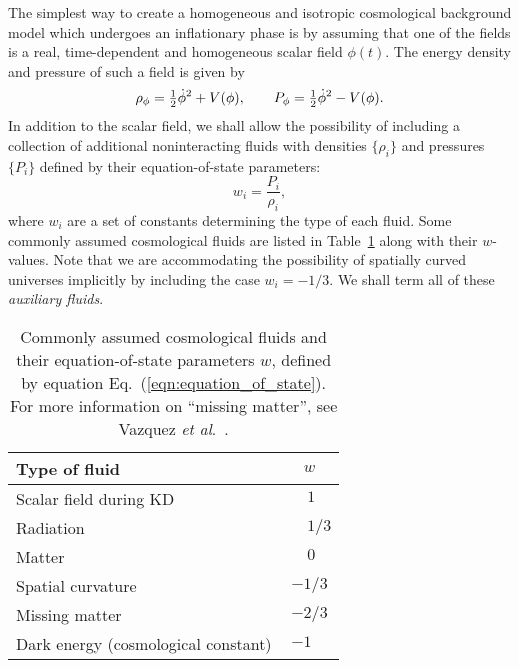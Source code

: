 The simplest way to create a homogeneous and isotropic cosmological
background model which undergoes an inflationary phase is by assuming
that one of the fields is a real, time-dependent and homogeneous
scalar field $\phi(t)$. The energy density and pressure of such a
field is given by 
%
\begin{equation}
  \rho_\phi = {\textstyle\frac{1}{2}}\dot{\phi}^2+V(\phi),
  \qquad
  P_\phi = {\textstyle\frac{1}{2}}\dot{\phi}^2-V(\phi).
  \label{eqn:rhopdef}
\end{equation}
%
In addition to the scalar field, we shall allow the possibility of
including a collection of additional noninteracting fluids with
densities $\{\rho_i\}$ and pressures $\{P_i\}$ defined by their
equation-of-state parameters:
%
\begin{equation}
  w_i =\frac{P_i}{\rho_i},
  \label{eqn:equation_of_state}
\end{equation}
%
where ${w_i}$ are a set of constants determining the type of each
fluid. Some commonly assumed cosmological fluids are listed in
Table~\ref{tab:type_of_fluid} along with their $w$-values. Note that
we are accommodating the possibility of spatially curved universes
implicitly by including the case $w_i=-1/3$. We shall term all of
these {\em auxiliary fluids}.
%
\begin{table}
  \caption{Commonly assumed cosmological fluids and their
    equation-of-state parameters $w$, defined by equation
    Eq.\ (\protect\ref{eqn:equation_of_state}).  For more information on
    ``missing matter'', see Vazquez {\it et al}.\
    \protect\cite{vazquez_2012}\label{tab:type_of_fluid}.
  }
    \begin{tabular}{lc}
      Type of fluid & $w$ \\
      \hline
      Scalar field during KD & $ \phantom{-}1\phantom{/3} $ \\
      Radiation & $ \phantom{-}1/3 $ \\
      Matter & $ \phantom{-}0\phantom{/3} $ \\
      Spatial curvature & $ -1/3$ \\
      Missing matter & $ -2/3$ \\
      Dark energy (cosmological constant) & $ -1\phantom{/3} $ \\
    \end{tabular}
\end{table}
%


